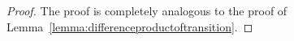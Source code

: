 \documentclass[10pt]{paper}
\newcommand{\norm}[1]{\left\lVert #1 \right\rVert}
\begin{document}
\begin{proof}
The proof is completely analogous to the proof of Lemma~\ref{lemma:differenceproductoftransition}.
\end{proof}
\end{document}
